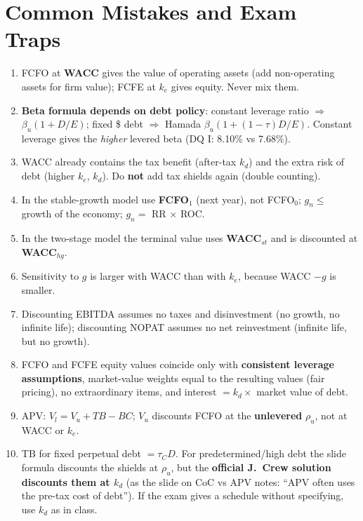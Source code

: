 \section{Common Mistakes and Exam Traps}

\begin{trapbox}
\begin{enumerate}[leftmargin=*]
  \item FCFO at \textbf{WACC} gives the value of operating assets (add non-operating assets for firm value); FCFE at $k_e$ gives equity. Never mix them.
  \item \textbf{Beta formula depends on debt policy}: constant leverage ratio $\Rightarrow$ $\beta_u(1+D/E)$; fixed \$ debt $\Rightarrow$ Hamada $\beta_u(1+(1-\tau)D/E)$. Constant leverage gives the \emph{higher} levered beta (DQ I: 8.10\% vs 7.68\%).
  \item WACC already contains the tax benefit (after-tax $k_d$) and the extra risk of debt (higher $k_e$, $k_d$). Do \textbf{not} add tax shields again (double counting).
  \item In the stable-growth model use \textbf{FCFO$_1$} (next year), not FCFO$_0$; $g_n\leq$ growth of the economy; $g_n=$ RR $\times$ ROC.
  \item In the two-stage model the terminal value uses \textbf{WACC$_{st}$} and is discounted at \textbf{WACC$_{hg}$}.
  \item Sensitivity to $g$ is larger with WACC than with $k_e$, because WACC $-g$ is smaller.
  \item Discounting EBITDA assumes no taxes and disinvestment (no growth, no infinite life); discounting NOPAT assumes no net reinvestment (infinite life, but no growth).
  \item FCFO and FCFE equity values coincide only with \textbf{consistent leverage assumptions}, market-value weights equal to the resulting values (fair pricing), no extraordinary items, and interest $= k_d\times$ market value of debt.
  \item APV: $V_l=V_u+TB-BC$; $V_u$ discounts FCFO at the \textbf{unlevered} $\rho_u$, not at WACC or $k_e$.
  \item TB for fixed perpetual debt $=\tau_C D$. For predetermined/high debt the slide formula discounts the shields at $\rho_u$, but the \textbf{official J.\ Crew solution discounts them at $k_d$} (as the slide on CoC vs APV notes: ``APV often uses the pre-tax cost of debt''). If the exam gives a schedule without specifying, use $k_d$ as in class.

\end{enumerate}
\end{trapbox}
